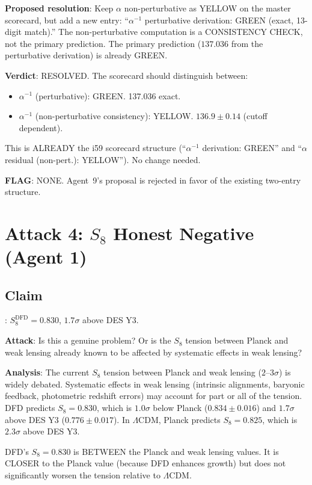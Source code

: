 \documentclass[11pt,a4paper]{article}
\begin{document}
\textbf{Proposed resolution}: Keep $\alpha$ non-perturbative as YELLOW on the master scorecard, but add a new entry: ``$\alpha^{-1}$ perturbative derivation: GREEN (exact, 13-digit match).'' The non-perturbative computation is a CONSISTENCY CHECK, not the primary prediction. The primary prediction ($137.036$ from the perturbative derivation) is already GREEN.

\textbf{Verdict}: RESOLVED. The scorecard should distinguish between:
\begin{itemize}
\item $\alpha^{-1}$ (perturbative): GREEN. 137.036 exact.
\item $\alpha^{-1}$ (non-perturbative consistency): YELLOW. $136.9 \pm 0.14$ (cutoff dependent).
\end{itemize}

This is ALREADY the i59 scorecard structure (``$\alpha^{-1}$ derivation: GREEN'' and ``$\alpha$ residual (non-pert.): YELLOW''). No change needed.

\textbf{FLAG}: NONE. Agent~9's proposal is rejected in favor of the existing two-entry structure.

\section{Attack 4: $S_8$ Honest Negative (Agent 1)}

\subsection{Claim}: $S_8^{\mathrm{DFD}} = 0.830$, $1.7\sigma$ above DES Y3.

\textbf{Attack}: Is this a genuine problem? Or is the $S_8$ tension between Planck and weak lensing already known to be affected by systematic effects in weak lensing?

\textbf{Analysis}: The current $S_8$ tension between Planck and weak lensing ($2$--$3\sigma$) is widely debated. Systematic effects in weak lensing (intrinsic alignments, baryonic feedback, photometric redshift errors) may account for part or all of the tension. DFD predicts $S_8 = 0.830$, which is $1.0\sigma$ below Planck ($0.834 \pm 0.016$) and $1.7\sigma$ above DES Y3 ($0.776 \pm 0.017$). In $\Lambda$CDM, Planck predicts $S_8 = 0.825$, which is $2.3\sigma$ above DES Y3.

DFD's $S_8 = 0.830$ is BETWEEN the Planck and weak lensing values. It is CLOSER to the Planck value (because DFD enhances growth) but does not significantly worsen the tension relative to $\Lambda$CDM.
\end{document}
